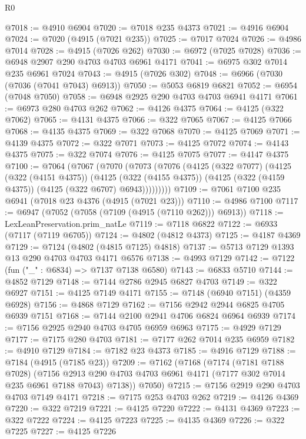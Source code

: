 \begin{lexlean}{R0}
\begin{coremodule}
@7018 := @4910 @6904
@7020 := @7018 @235 @4373
@7021 := @4916 @6904
@7024 := @7020 (@4915 (@7021 @235))
@7025 := @7017 @7024
@7026 := @4986 @7014
@7028 := @4915 (@7026 @262)
@7030 := @6972 (@7025 @7028)
@7036 := @6948 @2907 @290 @4703 @4703 @6961 @4171
@7041 := @6975 @302 @7014 @235 @6961 @7024
@7043 := @4915 (@7026 @302)
@7048 := @6966 (@7030 (@7036 (@7041 @7043) @6913))
@7050 := @5053 @6819 @6821
@7052 := @6954 (@7048 @7050)
@7058 := @6948 @2925 @290 @4703 @4703 @6941 @4171
@7061 := @6973 @280 @4703 @262
@7062 := @4126 @4375
@7064 := @4125 (@322 @7062)
@7065 := @4131 @4375
@7066 := @322 @7065
@7067 := @4125 @7066
@7068 := @4135 @4375
@7069 := @322 @7068
@7070 := @4125 @7069
@7071 := @4139 @4375
@7072 := @322 @7071
@7073 := @4125 @7072
@7074 := @4143 @4375
@7075 := @322 @7074
@7076 := @4125 @7075
@7077 := @4147 @4375
@7100 := @7064
    (@7067
      (@7070
        (@7073
          (@7076
            (@4125
              (@322 @7077)
              (@4125
                (@322 (@4151 @4375))
                (@4125
                  (@322 (@4155 @4375))
                  (@4125 (@322 (@4159 @4375)) (@4125 (@322 @6707) @6943)))))))))
@7109 := @7061 @7100 @235 @6941 (@7018 @23 @4376 (@4915 (@7021 @23)))
@7110 := @4986 @7100
@7117 := @6947 (@7052 (@7058 (@7109 (@4915 (@7110 @262))) @6913))
@7118 := LexLeanPreservation.prim_natLe
@7119 := @7118 @6822
@7122 := @6933 (@7117 (@7119 @6705))
@7124 := @4802 (@4812 @4373)
@7125 := @4187 @4369
@7129 := @7124 (@4802 (@4815 @7125) @4818)
@7137 := @5713 @7129 @1393 @13 @290 @4703 @4703 @4171 @6576
@7138 := @4993 @7129
@7142 := @7122 (fun ("_" : @6834) => @7137 @7138 @6580)
@7143 := @6833 @5710
@7144 := @4852 @7129
@7148 := @7144 @2786 @2945 @6827 @4703
@7149 := @322 @6927
@7151 := @4125 @7149 @4171
@7155 := @7148 (@6940 @7151) (@4359 @6928)
@7156 := @4868 @7129
@7162 := @7156 @2942 @2944 @6825 @4705 @6939 @7151
@7168 := @7144 @2100 @2941 @4706 @6824 @6964 @6939
@7174 := @7156 @2925 @2940 @4703 @4705 @6959 @6963
@7175 := @4929 @7129
@7177 := @7175 @280 @4703
@7181 := @7177 @262 @7014 @235 @6959
@7182 := @4910 @7129
@7184 := @7182 @23 @4373
@7185 := @4916 @7129
@7188 := @7184 (@4915 (@7185 @23))
@7209 := @7162
    (@7168
      (@7174
        (@7181 @7188 @7028)
        (@7156 @2913 @290 @4703 @4703 @6961 @4171 (@7177 @302 @7014 @235 @6961 @7188 @7043) @7138))
      @7050)
@7215 := @7156 @2919 @290 @4703 @4703 @7149 @4171
@7218 := @7175 @253 @4703 @262
@7219 := @4126 @4369
@7220 := @322 @7219
@7221 := @4125 @7220
@7222 := @4131 @4369
@7223 := @322 @7222
@7224 := @4125 @7223
@7225 := @4135 @4369
@7226 := @322 @7225
@7227 := @4125 @7226

\end{coremodule}
\end{lexlean}
